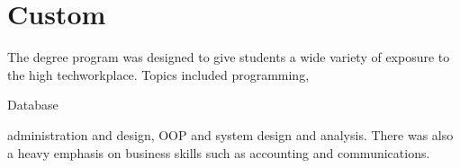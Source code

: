 \documentclass[11pt]{article}
\begin{document}
\section*{Custom}
%
\begin{leftrulebox}
	The degree program was designed to give students a wide variety of exposure to the high techworkplace.
    Topics included programming, \par
	Database \par
	administration and design, OOP and system design and analysis. There was also a heavy emphasis on
    business skills such as accounting and communications.
\end{leftrulebox}
%
\end{document}
